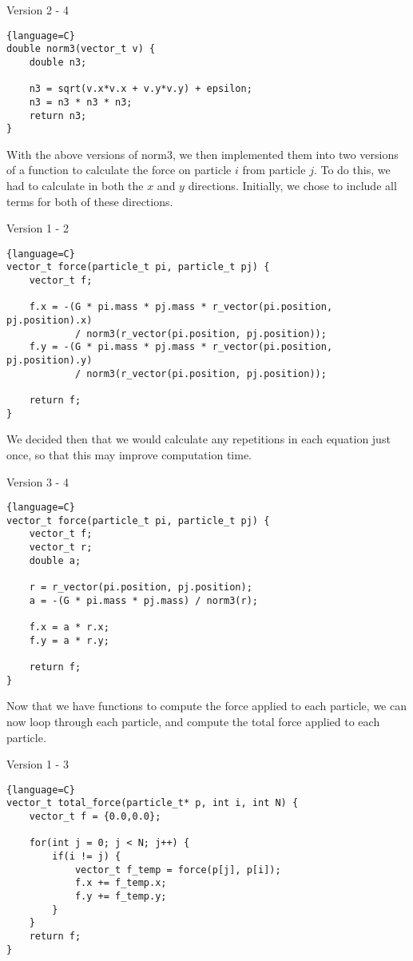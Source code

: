 \begin{center}
    Version 2 - 4
\end{center}
\begin{lstlisting}{language=C}
double norm3(vector_t v) {
    double n3;

    n3 = sqrt(v.x*v.x + v.y*v.y) + epsilon;
    n3 = n3 * n3 * n3;
    return n3;
}
\end{lstlisting}
With the above versions of norm3, we then implemented them into two versions of a function to calculate the force on particle $i$ from particle $j$. To do this, we had to calculate in both the $x$ and $y$ directions. Initially, we chose to include all terms for both of these directions.
\begin{center}
    Version 1 - 2
\end{center}
\begin{lstlisting}{language=C}
vector_t force(particle_t pi, particle_t pj) {
    vector_t f;

    f.x = -(G * pi.mass * pj.mass * r_vector(pi.position, pj.position).x)
            / norm3(r_vector(pi.position, pj.position));
    f.y = -(G * pi.mass * pj.mass * r_vector(pi.position, pj.position).y)
            / norm3(r_vector(pi.position, pj.position));

    return f;
}
\end{lstlisting}
We decided then that we would calculate any repetitions in each equation just once, so that this may improve computation time.
\begin{center}
    Version 3 - 4
\end{center}
\begin{lstlisting}{language=C}
vector_t force(particle_t pi, particle_t pj) {
    vector_t f;
    vector_t r;
    double a;

    r = r_vector(pi.position, pj.position);
    a = -(G * pi.mass * pj.mass) / norm3(r);

    f.x = a * r.x;
    f.y = a * r.y;

    return f;
}
\end{lstlisting}
Now that we have functions to compute the force applied to each particle, we can now loop through each particle, and compute the total force applied to each particle.
\begin{center}
    Version 1 - 3
\end{center}
\begin{lstlisting}{language=C}
vector_t total_force(particle_t* p, int i, int N) {
    vector_t f = {0.0,0.0};

    for(int j = 0; j < N; j++) {
        if(i != j) {
            vector_t f_temp = force(p[j], p[i]);
            f.x += f_temp.x;
            f.y += f_temp.y;
        }
    }
    return f;
}
\end{lstlisting}
